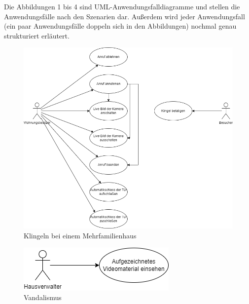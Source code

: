 Die Abbildungen 1 bis 4 sind UML-Anwendungsfalldiagramme und stellen die Anwendungsfälle nach den Szenarien dar.
Außerdem wird jeder Anwendungsfall (ein paar Anwendungsfälle doppeln sich in den Abbildungen) nochmal genau strukturiert erläutert.

\begin{figure}[ht!]
    \includegraphics[width=\paperwidth-2in]{../assets/img/UML-Anwendungsfalldiagramme-Klingeln bei einem Mehrfamilienhaus}
    \caption{Klingeln bei einem Mehrfamilienhaus}
    \label{fig:klingeln-bei-einem-mehrfamilienhaus}
\end{figure}

\begin{figure}[ht!]
    \includegraphics[width=\paperwidth-2in]{../assets/img/UML-Anwendungsfalldiagramme-Vandalismus.drawio}
    \caption{Vandalismus}
    \label{fig:vandalismus}
\end{figure}

